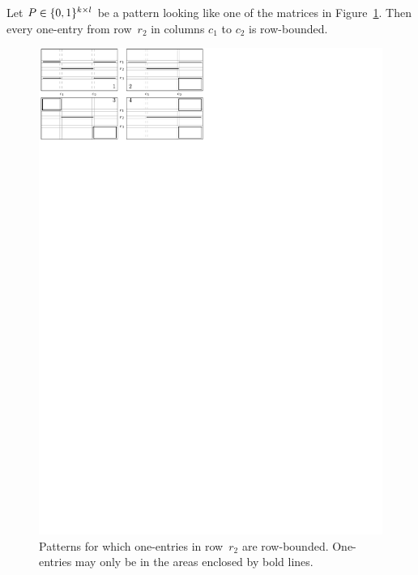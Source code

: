 \begin{lemma}
\label{lemmaH}
Let $P\in\{0,1\}^{k\times l}$ be a pattern looking like one of the matrices in Figure~\ref{lemmaHfig}. Then every one-entry from row~$r_2$ in columns $c_1$ to $c_2$ is row-bounded.

\begin{figure}[!ht]
\centering
\includegraphics[width=\textwidth]{img/lemmaH.pdf}
\caption{Patterns for which one-entries in row~$r_2$ are row-bounded. One-entries may only be in the areas enclosed by bold lines.}
\label{lemmaHfig}
\end{figure}
\end{lemma}
